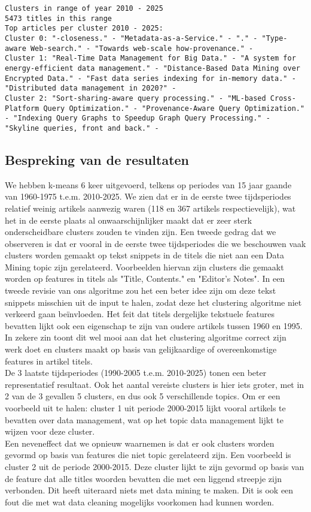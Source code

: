 \documentclass[11pt]{article}
\begin{document}
\begin{verbatim}
Clusters in range of year 2010 - 2025
5473 titles in this range
Top articles per cluster 2010 - 2025:
Cluster 0: "-closeness." - "Metadata-as-a-Service." - "." - "Type-aware Web-search." - "Towards web-scale how-provenance." - 
Cluster 1: "Real-Time Data Management for Big Data." - "A system for energy-efficient data management." - "Distance-Based Data Mining over Encrypted Data." - "Fast data series indexing for in-memory data." - "Distributed data management in 2020?" - 
Cluster 2: "Sort-sharing-aware query processing." - "ML-based Cross-Platform Query Optimization." - "Provenance-Aware Query Optimization." - "Indexing Query Graphs to Speedup Graph Query Processing." - "Skyline queries, front and back." - 

\end{verbatim}

\subsection{Bespreking van de resultaten}
 
We hebben k-means 6 keer uitgevoerd, telkens op periodes van 15 jaar gaande van 1960-1975 t.e.m. 2010-2025. We zien dat er in de eerste twee tijdsperiodes relatief weinig artikels aanwezig waren (118 en 367 artikels respectievelijk), wat het in de eerste plaats al onwaarschijnlijker maakt dat er zeer sterk onderscheidbare clusters zouden te vinden zijn. Een tweede gedrag dat we observeren is dat er vooral in de eerste twee tijdsperiodes die we beschouwen vaak clusters worden gemaakt op tekst snippets in de titels die niet aan een Data Mining topic zijn gerelateerd. Voorbeelden hiervan zijn clusters die gemaakt worden op features in titels als "Title, Contents." en "Editor's Notes". In een tweede revisie van ons algoritme zou het een beter idee zijn om deze tekst snippets misschien uit de input te halen, zodat deze het clustering algoritme niet verkeerd gaan be\"invloeden. Het feit dat titels dergelijke tekstuele features bevatten lijkt ook een eigenschap te zijn van oudere artikels tussen 1960 en 1995. In zekere zin toont dit wel mooi aan dat het clustering algoritme correct zijn werk doet en clusters maakt op basis van gelijkaardige of overeenkomstige features in artikel titels. \\

De 3 laatste tijdsperiodes (1990-2005 t.e.m. 2010-2025) tonen een beter representatief resultaat. Ook het aantal vereiste clusters is hier iets groter, met in 2 van de 3 gevallen 5 clusters, en dus ook 5 verschillende topics. Om er een voorbeeld uit te halen: cluster 1 uit periode 2000-2015 lijkt vooral artikels te bevatten over data management, wat op het topic data management lijkt te wijzen voor deze cluster. \\
Een neveneffect dat we opnieuw waarnemen is dat er ook clusters worden gevormd op basis van features die niet topic gerelateerd zijn. Een voorbeeld is cluster 2 uit de periode 2000-2015. Deze cluster lijkt te zijn gevormd op basis van de feature dat alle titles woorden bevatten die met een liggend streepje zijn verbonden. Dit heeft uiteraard niets met data mining te maken. Dit is ook een fout die met wat data cleaning mogelijks voorkomen had kunnen worden. 
\end{document}
